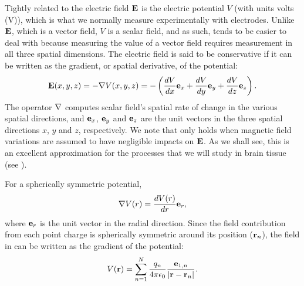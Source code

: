 Tightly related to the electric field ${\bf E}$ is the electric potential $V$ (with units volts (\si{\volt})), which is what we normally measure experimentally with electrodes. Unlike ${\bf E}$, which is a vector field, $V$ is a scalar field, and as such, tends to be easier to deal with because measuring the value of a vector field requires measurement in all three spatial dimensions. The electric field is said to be conservative if it can be written as the gradient, or spatial derivative, of the potential:
\begin{equation}
{\bf E}(x,y,z) = - {\bf \nabla} V(x,y,z) = - \left(\frac{dV}{dx} {\bf e}_x  + \frac{dV}{dy} {\bf e}_y + \frac{dV}{dz} {\bf e}_z \right).
\label{eq:Basics:EV}
\end{equation}
The operator ${\bf \nabla}$ computes scalar field's spatial rate of change in the various spatial directions, and ${\bf e}_x$, ${\bf e}_y$ and  ${\bf e}_z$ are the unit vectors in the three spatial directions $x$, $y$ and $z$, respectively. We note that  only holds when magnetic field variations are assumed to have negligible impacts on ${\bf E}$. As we shall see, this is an excellent approximation for the processes that we will study in brain tissue (see 
).

For a spherically symmetric potential,
\begin{equation}
{\bf \nabla} V(r) = \frac{dV(r)}{dr} {\bf {e}}_r, 
\label{eq:Basics:SphericalNablaPhi}
\end{equation}
where ${\bf {e}}_r$ is the unit vector in the radial direction. Since the field contribution from each point charge is spherically symmetric around its position (${\bf r}_n$), the field in  can be written as the gradient of the potential:
\begin{equation}
{V}({\bf r}) = \sum_{n=1}^{N}  \frac{q_n}{4\pi \epsilon_0} \frac{{{\bf e}}_{1,n}}{|{\bf r}-{\bf r}_n|}.
\label{eq:Basics:CoulombPhiN}
\end{equation}


